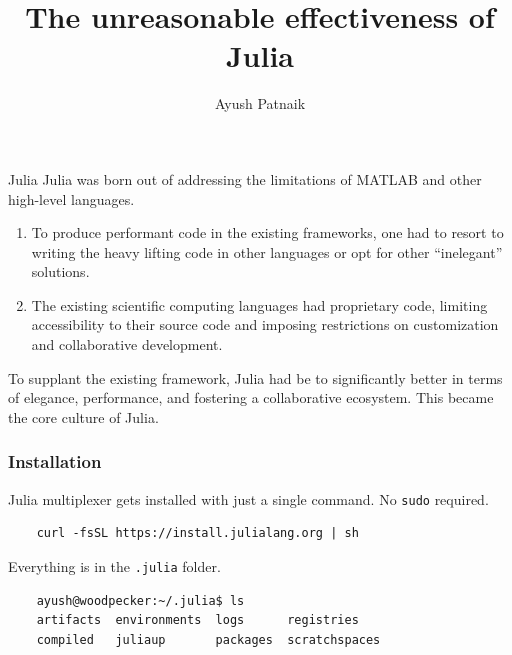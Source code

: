 \documentclass[aspectratio=169]{beamer} %
\title{The unreasonable effectiveness of Julia}
\author{Ayush Patnaik}
\begin{document}
\begin{frame}
  \titlepage
\end{frame}

\begin{frame}{Julia}
  Julia was born out of addressing the limitations of MATLAB and other high-level languages. 
  \begin{enumerate}
    \item To produce performant code in the existing frameworks, one had to resort to writing the heavy lifting code in other languages or opt for other ``inelegant'' solutions. 
    \item The existing scientific computing languages had proprietary code, limiting accessibility to their source code and imposing restrictions on customization and collaborative development.
  \end{enumerate}
  To supplant the existing framework, Julia had be to significantly better in terms of elegance, performance, and fostering a collaborative ecosystem. This became the core culture of Julia. 
  
\end{frame}

\begin{frame}[fragile]
  \frametitle{Installation}
  Julia multiplexer gets installed with just a single command. No \verb|sudo| required.  
  \begin{verbatim}
    curl -fsSL https://install.julialang.org | sh
  \end{verbatim}

  Everything is in the \verb|.julia| folder. 
  \begin{verbatim}
    ayush@woodpecker:~/.julia$ ls
    artifacts  environments  logs      registries
    compiled   juliaup       packages  scratchspaces
  \end{verbatim}

\end{frame}
\end{document}

